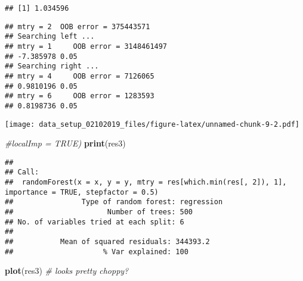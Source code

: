 \documentclass[]{article}
\newenvironment{Shaded}{\begin{snugshade}}{\end{snugshade}}
\newcommand{\KeywordTok}[1]{\textcolor[rgb]{0.13,0.29,0.53}{\textbf{{#1}}}}
\newcommand{\DataTypeTok}[1]{\textcolor[rgb]{0.13,0.29,0.53}{{#1}}}
\newcommand{\DecValTok}[1]{\textcolor[rgb]{0.00,0.00,0.81}{{#1}}}
\newcommand{\FloatTok}[1]{\textcolor[rgb]{0.00,0.00,0.81}{{#1}}}
\newcommand{\StringTok}[1]{\textcolor[rgb]{0.31,0.60,0.02}{{#1}}}
\newcommand{\CommentTok}[1]{\textcolor[rgb]{0.56,0.35,0.01}{\textit{{#1}}}}
\newcommand{\OtherTok}[1]{\textcolor[rgb]{0.56,0.35,0.01}{{#1}}}
\newcommand{\NormalTok}[1]{{#1}}
\begin{document}
\begin{verbatim}
## [1] 1.034596
\end{verbatim}

\begin{Shaded}
\end{Shaded}

\begin{verbatim}
## mtry = 2  OOB error = 375443571 
## Searching left ...
## mtry = 1     OOB error = 3148461497 
## -7.385978 0.05 
## Searching right ...
## mtry = 4     OOB error = 7126065 
## 0.9810196 0.05 
## mtry = 6     OOB error = 1283593 
## 0.8198736 0.05
\end{verbatim}

\texttt{[image: data\_setup\_02102019\_files/figure-latex/unnamed-chunk-9-2.pdf]}

\begin{Shaded}
\begin{Highlighting}[]
              \CommentTok{#localImp = TRUE)}
\KeywordTok{print}\NormalTok{(res3)}
\end{Highlighting}
\end{Shaded}

\begin{verbatim}
## 
## Call:
##  randomForest(x = x, y = y, mtry = res[which.min(res[, 2]), 1],      importance = TRUE, stepfactor = 0.5) 
##                Type of random forest: regression
##                      Number of trees: 500
## No. of variables tried at each split: 6
## 
##           Mean of squared residuals: 344393.2
##                     % Var explained: 100
\end{verbatim}

\begin{Shaded}
\begin{Highlighting}[]
\KeywordTok{plot}\NormalTok{(res3)         }\CommentTok{# looks pretty choppy?}
\end{Highlighting}
\end{Shaded}
\end{document}
